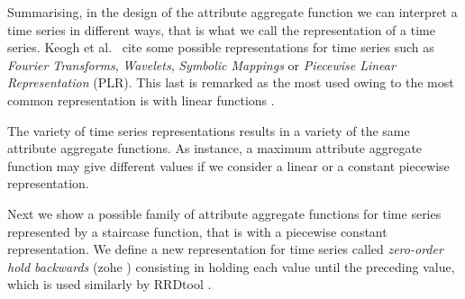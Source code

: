 



Summarising, in the design of the attribute aggregate function we can
interpret a time series in different ways, that is what we call the
representation of a time series. Keogh et al.\ \cite{last:keogh} cite
some possible representations for time series such as \emph{Fourier
  Transforms}, \emph{Wavelets}, \emph{Symbolic Mappings} or
\emph{Piecewise Linear Representation} (PLR). This last is remarked as
the most used owing to the most common representation is with linear
functions \cite{keogh01}.

The variety of time series representations results in a variety of the
same attribute aggregate functions. As instance, a maximum attribute
aggregate function may give different values if we consider a linear
or a constant piecewise representation. 


Next we show a possible family of attribute aggregate functions for
time series represented by a staircase function, that is with a
piecewise constant representation.  We define a new representation for
time series called \emph{zero-order hold backwards}
(zohe%
) consisting in holding each value until the preceding value, which is
used similarly by RRDtool \cite{lisa98:oetiker}.

